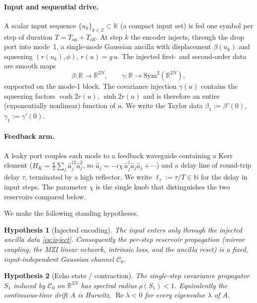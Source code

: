 \documentclass[11pt]{article}
\newtheorem{hypothesis}{Hypothesis}
\theoremstyle{remark}
\newcommand{\ahat}{\hat{a}}
\newcommand{\Sym}{\mathrm{Sym}}
\newcommand{\Cz}{\mathcal{C}_0}
\begin{document}
\paragraph{Input and sequential drive.}
A scalar input sequence $\{u_k\}_{k\in\mathbb{Z}}\subset\mathbb{K}$ (a compact
input set) is fed one symbol per step of duration $T=T_{\mathrm{on}}+T_{\mathrm{off}}$.
At step $k$ the encoder injects, through the drop port into mode~1, a single-mode
Gaussian ancilla with displacement $\beta(u_k)$ and squeezing $(r(u_k),\phi)$,
$r(u)=g\,u$. The injected first- and second-order data are smooth maps
\begin{equation}
\beta:\mathbb{R}\to\mathbb{R}^{2N},\qquad
\gamma:\mathbb{R}\to\Sym^2(\mathbb{R}^{2N}),
\label{eq:inject}
\end{equation}
supported on the mode-1 block. The covariance injection $\gamma(u)$ contains the
squeezing factors $\cosh 2r(u),\ \sinh 2r(u)$ and is therefore an entire
(exponentially nonlinear) function of $u$. We write the Taylor data
$\beta_1:=\beta'(0)$, $\gamma_1:=\gamma'(0)$.

\paragraph{Feedback arm.}
A leaky port couples each mode to a feedback waveguide containing a Kerr element
($H_K=\tfrac{\chi}{2}\sum_j \ahat_j^{\dagger2}\ahat_j^2$, so
$\dot{\ahat}_j=-i\chi\,\ahat_j^\dagger \ahat_j\ahat_j+\cdots$) and a delay line of
round-trip delay $\tau$, terminated by a high reflector. We write
$\ell_\tau:=\tau/T\in\mathbb{N}$ for the delay in input steps. The parameter
$\chi$ is the single knob that distinguishes the two reservoirs compared below.

We make the following standing hypotheses.

\begin{hypothesis}[Injected encoding]\label{H1}
The input enters only through the injected ancilla data \eqref{eq:inject}.
Consequently the per-step reservoir propagation (mirror coupling, the MZI linear
network, intrinsic loss, and the ancilla reset) is a fixed, input-independent
Gaussian channel $\Cz$.
\end{hypothesis}

\begin{hypothesis}[Echo state / contraction]\label{H2}
The single-step covariance propagator $S_1$ induced by $\Cz$ on
$\mathbb{R}^{2N}$ has spectral radius $\rho(S_1)<1$. Equivalently the
continuous-time drift $A$ is Hurwitz, $\operatorname{Re}\lambda<0$ for every
eigenvalue $\lambda$ of $A$.
\end{hypothesis}
\end{document}
